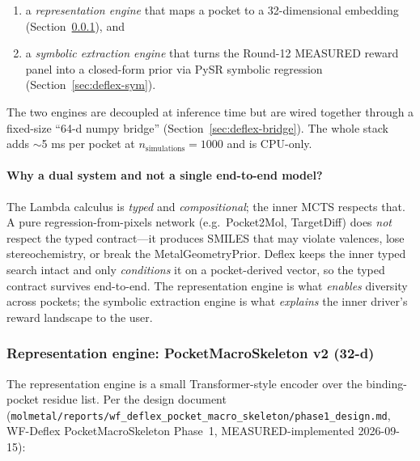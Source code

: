\begin{enumerate}
  \item a \emph{representation engine} that maps a pocket to a
        32-dimensional embedding (Section~\ref{sec:deflex-rep}),
        and
  \item a \emph{symbolic extraction engine} that turns the
        Round-12 MEASURED reward panel into a closed-form prior via
        PySR symbolic regression (Section~\ref{sec:deflex-sym}).
\end{enumerate}

The two engines are decoupled at inference time but are wired
together through a fixed-size ``64-d numpy bridge''
(Section~\ref{sec:deflex-bridge}).  The whole stack adds $\sim$5 ms
per pocket at $n_{\text{simulations}}=1000$ and is CPU-only.

\paragraph{Why a dual system and not a single end-to-end model?}
The Lambda calculus is \emph{typed} and \emph{compositional}; the
inner MCTS respects that.  A pure regression-from-pixels network
(e.g.\ Pocket2Mol, TargetDiff) does \emph{not} respect the typed
contract---it produces SMILES that may violate valences, lose
stereochemistry, or break the MetalGeometryPrior.  Deflex keeps the
inner typed search intact and only \emph{conditions} it on a
pocket-derived vector, so the typed contract survives end-to-end.
The representation engine is what \emph{enables} diversity across
pockets; the symbolic extraction engine is what \emph{explains} the
inner driver's reward landscape to the user.

\subsubsection{Representation engine: PocketMacroSkeleton v2 (32-d)}
\label{sec:deflex-rep}

The representation engine is a small Transformer-style encoder over
the binding-pocket residue list.  Per the design document
(\texttt{molmetal/reports/wf\_deflex\_pocket\_macro\_skeleton/phase1\_design.md},
WF-Deflex PocketMacroSkeleton Phase~1, MEASURED-implemented
2026-09-15):

